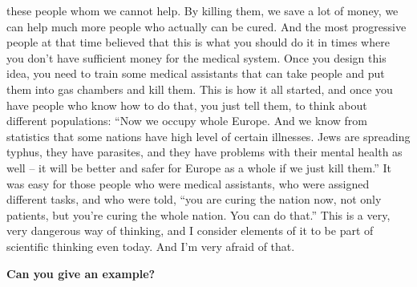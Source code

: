 these people whom we cannot help. By killing them, we save a lot of money, we can help much more people who actually can be cured. And the most progressive people at that time believed that this is what you should do it in times where you don’t have sufficient money for the medical system. Once you design this idea, you need to train some medical assistants that can take people and put them into gas chambers and kill them. This is how it all started, and once you have people who know how to do that, you just tell them, to think about different populations: ``Now we occupy whole Europe. And we know from statistics that some nations have high level of certain illnesses. Jews are spreading typhus, they have parasites, and they have problems with their mental health as well – it will be better and safer for Europe as a whole if we just kill them.'' It was easy for those people who were medical assistants, who were assigned different tasks, and who were told, “you are curing the nation now, not only patients, but you’re curing the whole nation. You can do that.” This is a very, very dangerous way of thinking, and I consider elements of it to be part of scientific thinking even today. And I’m very afraid of that.

\textbf{Can you give an example?} 

